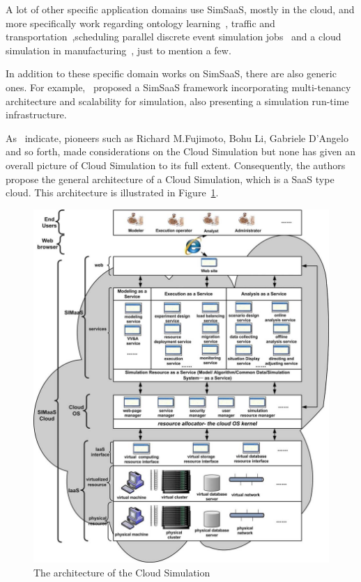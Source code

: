 \documentclass[conference]{IEEEtran}
\begin{document}
A lot of other specific application domains use SimSaaS, mostly in the cloud, and more specifically work regarding ontology learning~\cite{Wang2014179}, traffic and transportation~\cite{Harri2010},scheduling parallel discrete event simulation jobs~\cite{Liu2012} and a cloud simulation in manufacturing~\cite{Taylor201489}, just to mention a few.

In addition to these specific domain works on SimSaaS, there are also generic ones. For example,~\cite{Tsai:2011:SSS:2048370.2048381} proposed a SimSaaS framework incorporating multi-tenancy architecture and scalability for simulation, also presenting a simulation run-time infrastructure.

As~\cite{Liu201271} indicate, pioneers such as Richard M.Fujimoto, Bohu Li, Gabriele D'Angelo and so forth, made considerations on the Cloud Simulation but none has given an overall picture of Cloud Simulation to its full extent. Consequently, the authors propose the general architecture of a Cloud Simulation, which is a SaaS type cloud. This architecture is illustrated in Figure~\ref{fig:csim_arch}.

\begin{figure}[h!]
\centering
\includegraphics[width=.9\linewidth]{csim_arch.png}
\caption{ The architecture of the Cloud Simulation~\protect\cite{Liu201271}}
\label{fig:csim_arch}
\vspace{-0.9em}
\end{figure}
\end{document}

